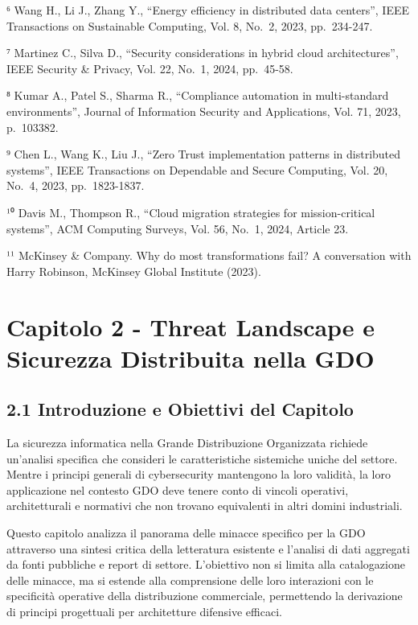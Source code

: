 \documentclass{report}
\begin{document}
⁶ Wang H., Li J., Zhang Y., ``Energy efficiency in distributed data
centers'', IEEE Transactions on Sustainable Computing, Vol. 8, No.~2,
2023, pp.~234-247.

⁷ Martinez C., Silva D., ``Security considerations in hybrid cloud
architectures'', IEEE Security \& Privacy, Vol. 22, No.~1, 2024,
pp.~45-58.

⁸ Kumar A., Patel S., Sharma R., ``Compliance automation in
multi-standard environments'', Journal of Information Security and
Applications, Vol. 71, 2023, p.~103382.

⁹ Chen L., Wang K., Liu J., ``Zero Trust implementation patterns in
distributed systems'', IEEE Transactions on Dependable and Secure
Computing, Vol. 20, No.~4, 2023, pp.~1823-1837.

¹⁰ Davis M., Thompson R., ``Cloud migration strategies for
mission-critical systems'', ACM Computing Surveys, Vol. 56, No.~1, 2024,
Article 23.

¹¹ McKinsey \& Company. Why do most transformations fail? A conversation
with Harry Robinson, McKinsey Global Institute (2023).

\chapter{Capitolo 2 - Threat Landscape e Sicurezza Distribuita nella
GDO}\label{capitolo-2---threat-landscape-e-sicurezza-distribuita-nella-gdo}

\section{2.1 Introduzione e Obiettivi del
Capitolo}\label{introduzione-e-obiettivi-del-capitolo}

La sicurezza informatica nella Grande Distribuzione Organizzata richiede
un'analisi specifica che consideri le caratteristiche sistemiche uniche
del settore. Mentre i principi generali di cybersecurity mantengono la
loro validità, la loro applicazione nel contesto GDO deve tenere conto
di vincoli operativi, architetturali e normativi che non trovano
equivalenti in altri domini industriali.

Questo capitolo analizza il panorama delle minacce specifico per la GDO
attraverso una sintesi critica della letteratura esistente e l'analisi
di dati aggregati da fonti pubbliche e report di settore. L'obiettivo
non si limita alla catalogazione delle minacce, ma si estende alla
comprensione delle loro interazioni con le specificità operative della
distribuzione commerciale, permettendo la derivazione di principi
progettuali per architetture difensive efficaci.
\end{document}

